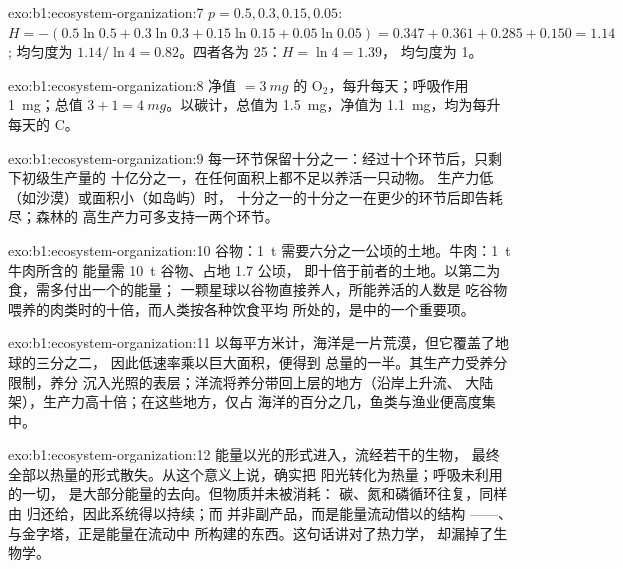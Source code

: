 \begin{solution}{exo:b1:ecosystem-organization:7}
$p = 0.5, 0.3, 0.15, 0.05$: $H = -(0.5\ln 0.5 + 0.3\ln 0.3 + 0.15\ln
0.15 + 0.05\ln 0.05) = 0.347 + 0.361 + 0.285 + 0.150 = 1.14$;
均匀度为 $1.14/\ln 4 = 0.82$。四者各为 25：$H = \ln 4 = 1.39$，
均匀度为 1。
\end{solution}

\begin{solution}{exo:b1:ecosystem-organization:8}
净值 $= \qty{3}{mg}$ 的 $\mathrm{O_2}$，每升每天；呼吸作用
\qty{1}{mg}；总值 $3 + 1 = \qty{4}{mg}$。以碳计，总值为
\qty{1.5}{mg}，净值为 \qty{1.1}{mg}，均为每升每天的 C。
\end{solution}

\begin{solution}{exo:b1:ecosystem-organization:9}
每一环节保留十分之一：经过十个环节后，只剩下初级生产量的
十亿分之一，在任何面积上都不足以养活一只动物。
生产力低（如沙漠）或面积小（如岛屿）时，
十分之一的十分之一在更少的环节后即告耗尽；森林的
高生产力可多支持一两个环节。
\end{solution}

\begin{solution}{exo:b1:ecosystem-organization:10}
谷物：\qty{1}{t} 需要六分之一公顷的土地。牛肉：\qty{1}{t} 牛肉所含的
能量需 \qty{10}{t} 谷物、占地 \num{1.7} 公顷，
即十倍于前者的土地。以第二为食，需多付出一个的能量；
一颗星球以谷物直接养人，所能养活的人数是
吃谷物喂养的肉类时的十倍，而人类按各种饮食平均
所处的，是中的一个重要项。
\end{solution}

\begin{solution}{exo:b1:ecosystem-organization:11}
以每平方米计，海洋是一片荒漠，但它覆盖了地球的三分之二，
因此低速率乘以巨大面积，便得到
总量的一半。其生产力受养分限制，养分
沉入光照的表层；洋流将养分带回上层的地方（沿岸上升流、
大陆架），生产力高十倍；在这些地方，仅占
海洋的百分之几，鱼类与渔业便高度集中。
\end{solution}

\begin{solution}{exo:b1:ecosystem-organization:12}
能量以光的形式进入，流经若干的生物，
最终全部以热量的形式散失。从这个意义上说，确实把
阳光转化为热量；呼吸未利用的一切，
是大部分能量的去向。但物质并未被消耗：
碳、氮和磷循环往复，同样由
归还给，因此系统得以持续；而
并非副产品，而是能量流动借以的结构
——、与金字塔，正是能量在流动中
所构建的东西。这句话讲对了热力学，
却漏掉了生物学。
\end{solution}

